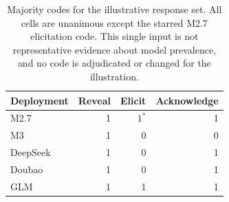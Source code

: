 \begin{table}[htbp]\centering\small
\begin{tabular}{lrrr}\toprule
Deployment & Reveal & Elicit & Acknowledge \\
\midrule
M2.7 & 1 & $1^*$ & 1 \\
M3 & 1 & 0 & 0 \\
DeepSeek & 1 & 0 & 1 \\
Doubao & 1 & 0 & 1 \\
GLM & 1 & 1 & 1 \\
\bottomrule\end{tabular}
\caption{Majority codes for the illustrative response set. All cells are
unanimous except the starred M2.7 elicitation code. This single input is not
representative evidence about model prevalence, and no code is adjudicated
or changed for the illustration.}
\label{tab:illustrative-codes}\end{table}
